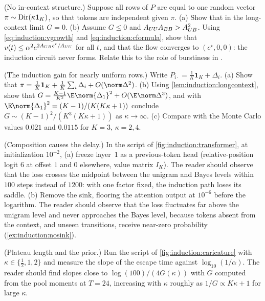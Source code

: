 \begin{refsection}
\begin{exercises}
\item \variation\hard (No in-context structure.) Suppose all rows of $P$ are equal to one random vector $\pi\sim\operatorname{Dir}(\kappa\mathbf1_K)$, so that tokens are independent given $\pi$. (a) Show that in the long-context limit $G=0$. (b) Assume $G\le0$ and $A_{UU}A_{BB}>A_{UB}^2$. Using \eqref{eq:induction:vgrowth} and \eqref{eq:induction:cformula}, show that $v(t)\le\alpha^2e^{2A_{UB} c^\star/A_{UU}}$ for all $t$, and that the flow converges to $(c^\star,0,0)$: the induction circuit never forms.  Relate this to the role of burstiness in \textcite{ChanEtAl2022}. \label{ex:induction:iid}

\item \variation\hard (The induction gain for nearly uniform rows.) Write $P_{i\cdot}=\frac1K\mathbf1_K+\Delta_i$. (a) Show that $\pi=\frac1K\mathbf1_K+\frac1K\sum_i\Delta_i+O(\norm\Delta^2)$. (b) Using \cref{lem:induction:longcontext}, show that $G=\frac{K-1}{K^2}\E\norm{\Delta_1}^2+O(\E\norm\Delta^3)$, and with $\E\norm{\Delta_1}^2=(K-1)/(K(K\kappa+1))$ conclude $G\sim(K-1)^2/(K^3(K\kappa+1))$ as $\kappa\to\infty$. (c) Compare with the Monte Carlo values $0.021$ and $0.0115$ for $K=3$, $\kappa=2,4$.  \label{ex:induction:kappa}

\item \simulation (Composition causes the delay.) In the script of \cref{fig:induction:transformer}, at initialization $10^{-2}$, (a) freeze layer~1 as a previous-token head (relative-position logit $6$ at offset $1$ and $0$ elsewhere, value matrix $I_K$). The reader should observe that the loss crosses the midpoint between the unigram and Bayes levels within $100$ steps instead of $1200$: with one factor fixed, the induction path loses its saddle. (b) Remove the sink, flooring the attention output at $10^{-6}$ before the logarithm. The reader should observe that the loss fluctuates far above the unigram level and never approaches the Bayes level, because tokens absent from the context, and unseen transitions, receive near-zero probability (\cref{ex:induction:nosink}). \label{ex:induction:freeze}

\item \simulation (Plateau length and the prior.) Run the script of \cref{fig:induction:caricature} with $\kappa\in\{\frac12,1,2\}$ and measure the slope of the escape time against $\log_{10}(1/\alpha)$. The reader should find slopes close to $\log(100)/(4G(\kappa))$ with $G$ computed from the pool moments at $T=24$, increasing with $\kappa$ roughly as $1/G\propto K\kappa+1$ for large $\kappa$. \label{ex:induction:kappasim}


\end{exercises}
\end{refsection}
